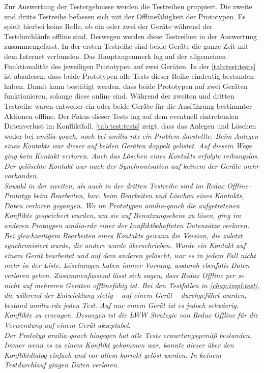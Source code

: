 Zur Auswertung der Testergebnisse werden die Testreihen gruppiert.
Die zweite und dritte Testreihe befassen sich mit der Offlinefähigkeit der Prototypen.
Es spielt hierbei keine Rolle, ob ein oder zwei der Geräte während der Testdurchläufe offline sind. Deswegen werden diese Testreihen in der Auswertung zusammengefasst.
%
%
%
In der ersten Testreihe sind beide Geräte die ganze Zeit mit dem Internet verbunden.
Das Hauptaugenmerk lag auf der allgemeinen Funktionalität des jeweiligen Prototypen auf zwei Geräten.
In der \autoref{tab:test:tests} ist abzulesen, dass beide Prototypen alle Tests dieser Reihe eindeutig bestanden haben.
Damit kann bestätigt werden, dass beide Prototypen auf zwei Geräten funktionieren, solange diese online sind.
%
%
%
Während der zweiten und dritten Testreihe waren entweder ein oder beide Geräte für die Ausführung bestimmter Aktionen offline.
Der Fokus dieser Tests lag auf dem eventuell eintretenden Datenverlust im Konfliktfall.
\autoref{tab:test:tests} zeigt, dass das Anlegen und Löschen weder bei \it{amilia-qouch}, noch bei \it{amilia-rdx} ein Problem darstellte.
Beim Anlegen eines Kontakts war dieser auf beiden Geräten doppelt gelistet. Auf diesem Wege ging kein Kontakt verloren.
Auch das Löschen eines Kontakts erfolgte reibungslos. Der gelöschte Kontakt war nach der Synchronisation auf keinem der Geräte mehr vorhanden.\\
%
Sowohl in der zweiten, als auch in der dritten Testreihe sind im Redux Offline--Prototyp beim Bearbeiten, bzw. beim Bearbeiten und Löschen eines Kontakts, Daten verloren gegangen.
Wo im Prototypen \it{amilia-qouch} die aufgetretenen Konflikte gespeichert wurden, um sie auf Benutzungsebene zu lösen, ging im anderen Protoypen \it{amilia-rdx} einer der konfliktbehafteten Datensätze verloren.
Bei gleichzeitigem Bearbeiten eines Kontakts gewann die Version, die zuletzt synchronisiert wurde, die andere wurde überschrieben.
Wurde ein Kontakt auf einem Gerät bearbeitet und auf dem anderen gelöscht, war es in jedem Fall nicht mehr in der Liste. Löschungen haben immer Vorrang, wodurch ebenfalls Daten verloren gehen.
% 
%
Zusammenfassend lässt sich sagen, dass Redux Offline per se nicht auf mehreren Geräten offlinefähig ist.
Bei den Testfällen in \autoref{chap:impl:test}, die während der Entwicklung stetig -- auf einem Gerät -- durchgeführt wurden, bestand \it{amilia-rdx} jeden Test.
Auf nur einem Gerät ist es jedoch schwierig, Konflikte zu erzeugen. Deswegen ist die \gls{LWW} Strategie von Redux Offline für die Verwendung auf einem Gerät akzeptabel.\\
Der Prototyp \it{amilia-qouch} hingegen hat alle Tests erwartungsgemäß bestanden.
Immer wenn es zu einem Konflikt gekommen war, konnte dieser über den Konfliktdialog einfach und vor allem korrekt gelöst werden.
In keinem Testdurchlauf gingen Daten verloren.
%